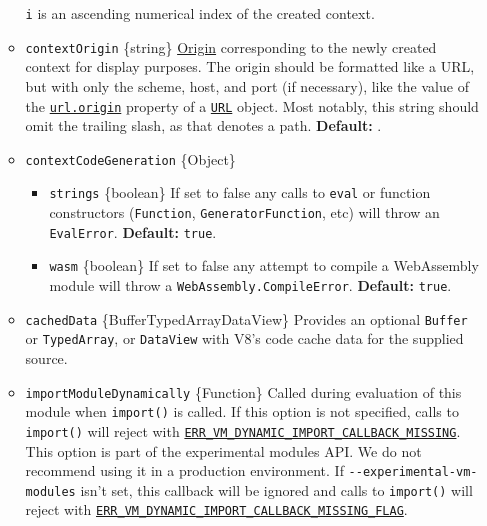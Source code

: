 \begin{itemize}
\begin{itemize}
    \texttt{i} is an ascending numerical index of the created context.
  \item
    \texttt{contextOrigin} \{string\}
    \href{https://developer.mozilla.org/en-US/docs/Glossary/Origin}{Origin}
    corresponding to the newly created context for display purposes. The
    origin should be formatted like a URL, but with only the scheme,
    host, and port (if necessary), like the value of the
    \href{url.md\#urlorigin}{\texttt{url.origin}} property of a
    \href{url.md\#class-url}{\texttt{URL}} object. Most notably, this
    string should omit the trailing slash, as that denotes a path.
    \textbf{Default:} \texttt{\textquotesingle{}\textquotesingle{}}.
  \item
    \texttt{contextCodeGeneration} \{Object\}

    \begin{itemize}
    \tightlist
    \item
      \texttt{strings} \{boolean\} If set to false any calls to
      \texttt{eval} or function constructors (\texttt{Function},
      \texttt{GeneratorFunction}, etc) will throw an \texttt{EvalError}.
      \textbf{Default:} \texttt{true}.
    \item
      \texttt{wasm} \{boolean\} If set to false any attempt to compile a
      WebAssembly module will throw a \texttt{WebAssembly.CompileError}.
      \textbf{Default:} \texttt{true}.
    \end{itemize}
  \item
    \texttt{cachedData} \{Buffer\textbar TypedArray\textbar DataView\}
    Provides an optional \texttt{Buffer} or \texttt{TypedArray}, or
    \texttt{DataView} with V8's code cache data for the supplied source.
  \item
    \texttt{importModuleDynamically} \{Function\} Called during
    evaluation of this module when \texttt{import()} is called. If this
    option is not specified, calls to \texttt{import()} will reject with
    \href{errors.md\#err_vm_dynamic_import_callback_missing}{\texttt{ERR\_VM\_DYNAMIC\_IMPORT\_CALLBACK\_MISSING}}.
    This option is part of the experimental modules API. We do not
    recommend using it in a production environment. If
    \texttt{-\/-experimental-vm-modules} isn't set, this callback will
    be ignored and calls to \texttt{import()} will reject with
    \href{errors.md\#err_vm_dynamic_import_callback_missing_flag}{\texttt{ERR\_VM\_DYNAMIC\_IMPORT\_CALLBACK\_MISSING\_FLAG}}.


\end{itemize}
\end{itemize}
